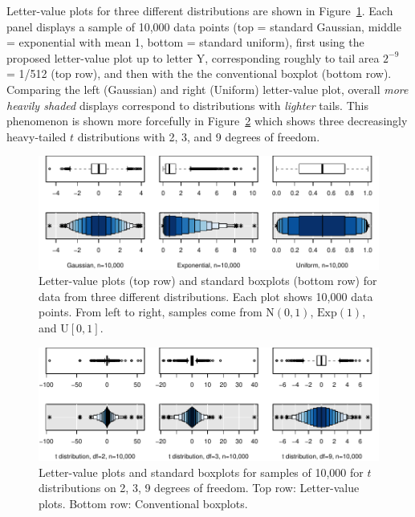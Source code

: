 \documentclass[12pt,oneside]{article}
\begin{document}
Letter-value plots for three different distributions are shown in Figure~\ref{stackbox}. Each panel displays a sample of 10,000 data points (top = standard Gaussian, middle = exponential with mean 1, bottom = standard uniform), first using the proposed letter-value plot up to letter Y, corresponding roughly to tail area $2^{-9}$ = 1/512 (top row), and then with the the conventional boxplot (bottom row). Comparing the left (Gaussian) and right (Uniform) letter-value plot, overall \textit{more heavily shaded} displays correspond to distributions with \textit{lighter} tails. This phenomenon is shown more forcefully in Figure~\ref{t-dist} which shows three decreasingly heavy-tailed $t$ distributions with 2, 3, and 9 degrees of freedom.

\begin{figure}[hbtp]
  \centering
  \includegraphics[width = \linewidth]{boxplots}

  \caption{Letter-value plots (top row) and standard boxplots (bottom row) for
  data from three different distributions. Each plot shows 10,000 data points.
  From left to right, samples come from $\mbox{N}(0,1)$, $\mbox{Exp}(1)$, and
  $\mbox{U}[0,1]$. }

  \label{stackbox}
\end{figure}

\begin{figure}[hbtp]
  \centering
  \includegraphics[width = \linewidth]{t-dist}
  
  \caption{Letter-value plots and standard boxplots for samples of 10,000
  for $t$ distributions on 2, 3, 9 degrees of freedom. Top row: Letter-value
  plots. Bottom row: Conventional boxplots.}
  \label{t-dist}
\end{figure}
\end{document}
